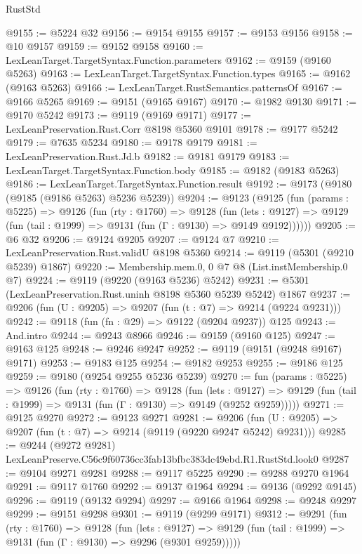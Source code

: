 \begin{lexlean}{RustStd}
\begin{coremodule}
@9155 := @5224 @32
@9156 := @9154 @9155
@9157 := @9153 @9156
@9158 := @10 @9157
@9159 := @9152 @9158
@9160 := LexLeanTarget.TargetSyntax.Function.parameters
@9162 := @9159 (@9160 @5263)
@9163 := LexLeanTarget.TargetSyntax.Function.types
@9165 := @9162 (@9163 @5263)
@9166 := LexLeanTarget.RustSemantics.patternsOf
@9167 := @9166 @5265
@9169 := @9151 (@9165 @9167)
@9170 := @1982 @9130
@9171 := @9170 @5242
@9173 := @9119 (@9169 @9171)
@9177 := LexLeanPreservation.Rust.Corr @8198 @5360 @9101
@9178 := @9177 @5242
@9179 := @7635 @5234
@9180 := @9178 @9179
@9181 := LexLeanPreservation.Rust.Jd.b
@9182 := @9181 @9179
@9183 := LexLeanTarget.TargetSyntax.Function.body
@9185 := @9182 (@9183 @5263)
@9186 := LexLeanTarget.TargetSyntax.Function.result
@9192 := @9173 (@9180 (@9185 (@9186 @5263) @5236 @5239))
@9204 := @9123
    (@9125
      (fun (params : @5225) =>
      @9126
        (fun (rty : @1760) =>
        @9128
          (fun (lets : @9127) =>
          @9129 (fun (tail : @1999) => @9131 (fun (Γ : @9130) => @9149 @9192))))))
@9205 := @6 @32
@9206 := @9124 @9205
@9207 := @9124 @7
@9210 := LexLeanPreservation.Rust.validU @8198 @5360
@9214 := @9119 (@5301 (@9210 @5239) @1867)
@9220 := Membership.mem.{0, 0} @7 @8 (List.instMembership.{0} @7)
@9224 := @9119 (@9220 (@9163 @5236) @5242)
@9231 := @5301 (LexLeanPreservation.Rust.uninh @8198 @5360 @5239 @5242) @1867
@9237 := @9206 (fun (U : @9205) => @9207 (fun (t : @7) => @9214 (@9224 @9231)))
@9242 := @9118 (fun (fn : @29) => @9122 (@9204 @9237)) @125
@9243 := And.intro
@9244 := @9243 @8966
@9246 := @9159 (@9160 @125)
@9247 := @9163 @125
@9248 := @9246 @9247
@9252 := @9119 (@9151 (@9248 @9167) @9171)
@9253 := @9183 @125
@9254 := @9182 @9253
@9255 := @9186 @125
@9259 := @9180 (@9254 @9255 @5236 @5239)
@9270 := fun (params : @5225) =>
  @9126
    (fun (rty : @1760) =>
    @9128
      (fun (lets : @9127) =>
      @9129 (fun (tail : @1999) => @9131 (fun (Γ : @9130) => @9149 (@9252 @9259)))))
@9271 := @9125 @9270
@9272 := @9123 @9271
@9281 := @9206 (fun (U : @9205) => @9207 (fun (t : @7) => @9214 (@9119 (@9220 @9247 @5242) @9231)))
@9285 := @9244 (@9272 @9281) LexLeanPreserve.C56c9f60736cc3fab13bfbc383dc49ebd.R1.RustStd.look0
@9287 := @9104 @9271 @9281
@9288 := @9117 @5225
@9290 := @9288 @9270 @1964
@9291 := @9117 @1760
@9292 := @9137 @1964
@9294 := @9136 (@9292 @9145)
@9296 := @9119 (@9132 @9294)
@9297 := @9166 @1964
@9298 := @9248 @9297
@9299 := @9151 @9298
@9301 := @9119 (@9299 @9171)
@9312 := @9291
    (fun (rty : @1760) =>
    @9128
      (fun (lets : @9127) =>
      @9129 (fun (tail : @1999) => @9131 (fun (Γ : @9130) => @9296 (@9301 @9259)))))

\end{coremodule}
\end{lexlean}
